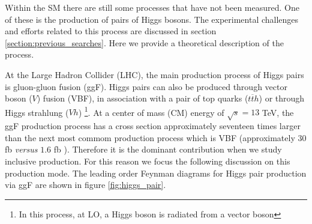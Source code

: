 %

Within the SM there are still some processes that have not been measured. One of these is the production of pairs of Higgs bosons. The experimental challenges and efforts related to this process are discussed in section \ref{section:previous_searches}. Here we provide a theoretical description of the process.

At the Large Hadron Collider (LHC), the main production process of Higgs pairs is gluon-gluon fusion (ggF). Higgs pairs can also be produced through vector boson ($V$) fusion (VBF), in association with a pair of top quarks ($t\overline{t}h$) or through Higgs strahlung ($Vh$) \footnote{In this process, at LO, a Higgs boson is radiated from a vector boson}. At a center of mass (CM) energy of $\sqrt{s}=13$ TeV, the ggF production process has a cross section approximately seventeen times larger than the next most commom production process which is VBF (approximately $30$ fb \textit{versus} $1.6$ fb \cite{hhxsNLO}). Therefore it is the dominant contribution when we study inclusive production. For this reason we focus the following discussion on this production mode. The leading order Feynman diagrams for Higgs pair production via ggF are shown in figure \ref{fig:higgs_pair}. 



